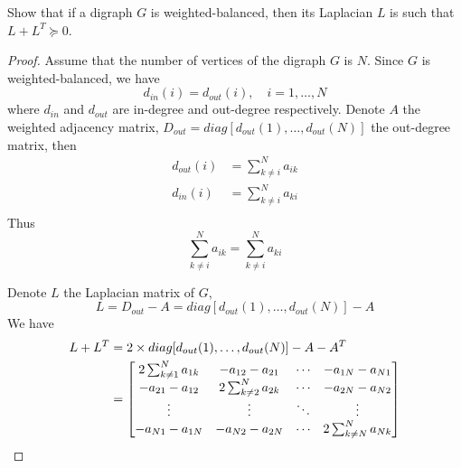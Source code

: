 \documentclass[a4 paper, 12pt]{article}
\begin{document}
 
 Show that if a digraph $G$ is weighted-balanced, then its Laplacian $L$ is such that $L+L^T \succeq 0$.

\begin{proof}

Assume that the number of vertices of the digraph $G$ is $N$. Since $G$ is weighted-balanced, we have 
\begin{equation}\label{eq:E1.12wei}
        d_{in}(i) = d_{out}(i), \quad i = 1,\dots,N
\end{equation}
where $d_{in}$ and $d_{out}$ are in-degree and out-degree respectively. Denote $A$ the weighted adjacency matrix, $D_{out} = diag[d_{out}(1), \dots, d_{out}(N)]$ the out-degree matrix, then
\begin{align}
        d_{out}(i) &= \sum_{k\neq i}^N a_{ik} \\ 
        d_{in}(i) &= \sum_{k\neq i}^N a_{ki} \\ 
\end{align}
Thus
\begin{equation}
        \sum_{k\neq i}^N a_{ik} = \sum_{k\neq i}^N a_{ki}
\end{equation}

Denote $L$ the Laplacian matrix of $G$, 
\begin{equation}
        L = D_{out} - A = diag[d_{out}(1), \dots, d_{out}(N)] - A
\end{equation}
We have
\begin{equation}
        \begin{aligned}
                L+L^T &= 2\times diag[d_{out}(1), \dots, d_{out}(N)] - A - A^T \\
                &= \begin{bmatrix} 
                2\sum_{k\neq 1}^N a_{1k}        &-a_{12}-a_{21}                 &\cdots         &-a_{1N}-a_{N1} \\
                -a_{21}-a_{12}                  &2\sum_{k\neq 2}^N a_{2k}       &\cdots         &-a_{2N}-a_{N2} \\
                \vdots                          &\vdots                         &\ddots         &\vdots         \\
                -a_{N1}-a_{1N}                  &-a_{N2}-a_{2N}                 &\cdots         &2\sum_{k\neq N}^N a_{Nk}
                \end{bmatrix}
        \end{aligned}
\end{equation}


\end{proof}
\end{document}
